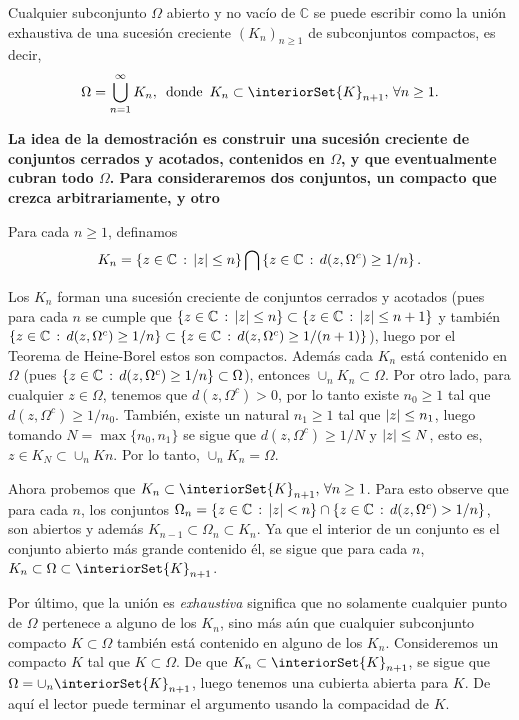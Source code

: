\begin{theo}
Cualquier subconjunto $\Omega$ abierto y no vacío de $\mathbb{C}$ se puede 
escribir como la unión exhaustiva de una sucesión creciente $(K_n)_{n \geq 1}$ 
de subconjuntos compactos, es decir,
$$
\Omega = \bigcup_{n=1}^{\infty} K_n, \, \text{ donde }\, K_n \subset \interiorSet{K}_{n+1}, \, \forall n \geq 1.
$$
\end{theo}
\begin{dem}
{\bf La idea de la demostración es construir una sucesión creciente
 de conjuntos cerrados y acotados, contenidos en $\Omega$, y que 
 eventualmente cubran todo $\Omega$. Para consideraremos dos conjuntos,
 un compacto que crezca arbitrariamente, y otro }

    Para cada $n\geq 1$, definamos 
    \begin{equation*}
        K_n = \left \{  z\in \mathbb{C} \, : \, |z| \leq n  \right \} 
        \bigcap 
        \left \{  z\in \mathbb{C} \, : \, d(z, \Omega^{c})\geq 1/n \right \}.
    \end{equation*}

    Los $K_n$ forman una sucesión creciente de conjuntos cerrados y acotados (pues para cada $n$ se cumple que 
    $\{  z\in \mathbb{C} \, : \, |z| \leq n  \} \subset \{  z\in \mathbb{C} \, : \, |z| \leq n+1  \}$ 
    y también $\{  z\in \mathbb{C} \, : \, d(z, \Omega^{c})\geq 1/n \} \subset \{  z\in \mathbb{C} \, : \, d(z, \Omega^{c})\geq 1/(n+1) \}$), 
    luego por el Teorema de Heine-Borel estos son compactos. 
    Además cada $K_n$ está contenido en $\Omega$ 
    (pues $\left\{  z\in \mathbb{C} \, : \, d(z, \Omega^{c})\geq 1/n \right\} \subset \Omega$), 
    entonces $\displaystyle \cup_{n}K_n \subset \Omega$. Por otro lado, para cualquier $z\in \Omega$,  
    tenemos que $d(z,\Omega^{c}) > 0$, por lo tanto existe $n_0\geq 1$  tal que $d(z,\Omega^{c})\geq 1/n_0$. 
    También, existe un natural $n_1\geq 1$ tal que $\left\lvert z\right\rvert \leq n_1$, luego tomando $N=\max\{n_0, n_1\}$ 
    se sigue que $d(z,\Omega^{c})\geq 1/N$ y  $\left\lvert z\right\rvert \leq N$, esto es, $z\in K_N \subset \cup_n Kn$. 
    Por lo tanto, $\displaystyle \cup_{n}K_n = \Omega$.  

    Ahora probemos que $K_n \subset \interiorSet{K}_{n+1}, \, \forall n \geq 1$. Para esto observe 
    que para cada $n$, los conjuntos 
    $\Omega_n = \left \{ z\in \mathbb{C} \, : \, |z| < n  \right \} \cap \left \{  z\in \mathbb{C} \, : \, d(z, \Omega^{c})> 1/n \right \}$, 
    son abiertos y además $K_{n-1} \subset \Omega_n \subset K_n$. Ya que el interior de un conjunto es 
    el conjunto abierto más grande contenido él, se sigue que para cada $n$, $K_n \subset \Omega \subset \interiorSet{K}_{n+1}$.
    
    Por último, que la unión es \textit{exhaustiva} significa que no solamente cualquier punto de $\Omega$ 
    pertenece a alguno de los $K_n$, sino más aún que cualquier subconjunto compacto $K \subset \Omega$ 
    también está contenido en alguno de los $K_n$. Consideremos un compacto $K$ tal que $K\subset \Omega$. 
    De que $K_n \subset \interiorSet{K}_{n+1}$, se sigue que $\Omega = \cup_n \interiorSet{K}_{n+1}$, 
    luego tenemos una cubierta abierta para $K$. De aquí el lector puede terminar el argumento usando 
    la compacidad de $K$.
\end{dem}
